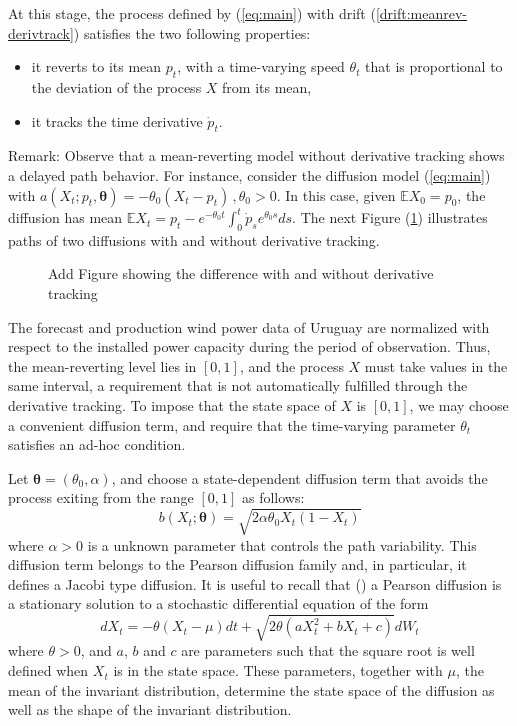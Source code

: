 \documentclass[11pt]{article}
\theoremstyle{definition}
\begin{document}
 At this stage, the process defined by (\ref{eq:main}) with drift (\ref{drift:meanrev-derivtrack}) satisfies the two following properties: 
\begin{itemize}
\item it reverts to its mean $p_t$, with a time-varying speed $ \theta_t$ that is proportional to the deviation of the process $X$ from its mean,
\item it tracks the time derivative $\dot{p}_t$.  
\end{itemize} 

Remark: {\color{red} Observe that a mean-reverting model without derivative tracking shows a delayed path behavior. For instance, consider the diffusion model (\ref{eq:main}) with $a(X_t; p_t, \bm{\theta}) = - \theta_0 (X_t - p_t)\,, \theta_0 > 0$. In this case, given  $ \mathbb{E} X_0 = p_0$, the diffusion has mean $\mathbb{E} X_t = p_t - e^{- \theta_0 t } \int_0^t \dot{p}_s  e^{\theta_0 s} ds$. The next Figure (\ref{fig:derivative_tracking}) illustrates paths of two diffusions with and without derivative tracking. }

\begin{figure}[h]
  \caption{Add Figure showing the difference with and without derivative tracking}
  \label{fig:derivative_tracking}
\end{figure}

The forecast and production wind power data of Uruguay are normalized with respect to the installed power capacity during the period of observation. Thus, the mean-reverting level lies in $[0,1]$, and the process $X$  must take values in the same interval, a requirement that is not automatically fulfilled through the derivative tracking. To impose that the state space of $X$ is $[0,1]$, we may choose a convenient diffusion term, and require that the time-varying parameter $ \theta_t$ satisfies an ad-hoc condition.
 
Let $\bm{\theta} = (\theta_0,\alpha)$, and choose a state-dependent diffusion term that avoids the process exiting from the range $[0,1]$ as follows:
  \begin{equation}
    b (X_t; \bm{\theta} )= \sqrt{2 \alpha \theta_0 X_t (1 - X_t)}
  \end{equation}
  where $\alpha >0$ is a unknown parameter that controls the path variability. This diffusion term belongs to the Pearson diffusion family and, in particular, it defines a Jacobi type diffusion. It is useful to recall that (\cite[440]{foso}) a Pearson diffusion is a stationary solution to a stochastic differential equation of the form
 \begin{equation}
    dX_t = - \theta (X_t - \mu) dt + \sqrt{2 \theta (a X_t^2 + b X_t + c)} dW_t
  \end{equation}
where $\theta>0$, and $a$, $b$ and $c$ are parameters such that the square root is well defined when $X_t$ is in the state space. These parameters, together with $\mu$, the mean of the invariant distribution, determine the state space of the diffusion as well as the shape of the invariant distribution. 
\end{document}
